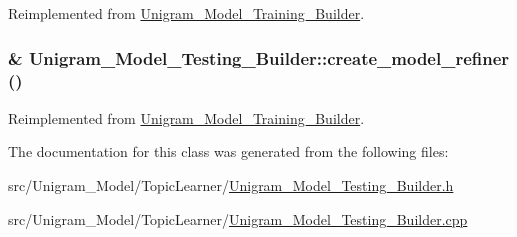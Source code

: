 Reimplemented from \hyperlink{class_unigram___model___training___builder_a7115521792cd0262b3bf99de8474420d}{Unigram\_\-Model\_\-Training\_\-Builder}.

\hypertarget{class_unigram___model___testing___builder_a694c9cb5f270cad6ff5e9d0b45da9ba6}{
\subsubsection[{create\_\-model\_\-refiner}]{ \& Unigram\_\-Model\_\-Testing\_\-Builder::create\_\-model\_\-refiner ()}}
\label{class_unigram___model___testing___builder_a694c9cb5f270cad6ff5e9d0b45da9ba6}


Reimplemented from \hyperlink{class_unigram___model___training___builder_a6693c87834917804525d1d8f4d638507}{Unigram\_\-Model\_\-Training\_\-Builder}.



The documentation for this class was generated from the following files:\begin{DoxyCompactItemize}
\item 
src/Unigram\_\-Model/TopicLearner/\hyperlink{_unigram___model___testing___builder_8h}{Unigram\_\-Model\_\-Testing\_\-Builder.h}\item 
src/Unigram\_\-Model/TopicLearner/\hyperlink{_unigram___model___testing___builder_8cpp}{Unigram\_\-Model\_\-Testing\_\-Builder.cpp}\end{DoxyCompactItemize}
